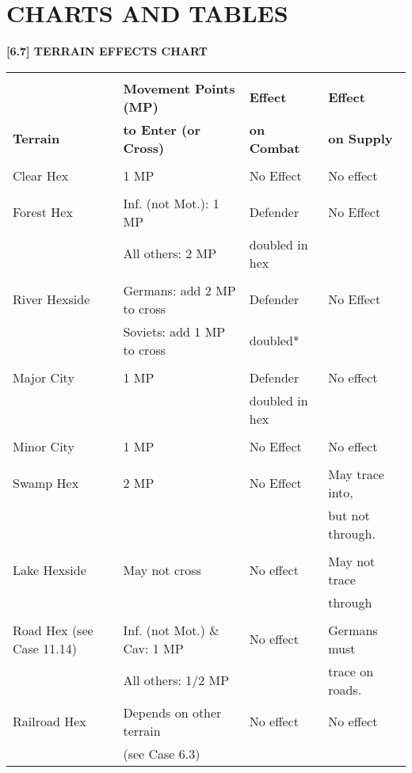\pagebreak
\section{CHARTS AND TABLES}

\textbf{[6.7] TERRAIN EFFECTS CHART}

\begin{tabular}{|llll|}
  \hline & & &\\[-2.0ex]
  & \textbf{Movement Points (MP)} & \textbf{Effect} & \textbf{Effect}\\
  \textbf{Terrain} & \textbf{to Enter (or Cross)} & \textbf{on Combat} & \textbf{on Supply}\\
  \hline & & &\\[-2.0ex]
  Clear Hex & 1 MP & No Effect & No effect\\
  \hline & & &\\[-2.0ex]
  Forest Hex & Inf. (not Mot.): 1 MP & Defender & No Effect\\
  & All others: 2 MP & doubled in hex &\\
  \hline & & &\\[-2.0ex]
  River Hexside & Germans: add 2 MP to cross & Defender & No Effect\\
  & Soviets: add 1 MP to cross & doubled* &\\
  \hline & & &\\[-2.0ex]
  Major City & 1 MP & Defender & No effect\\
  & & doubled in hex &\\
  \hline & & &\\[-2.0ex]
  Minor City & 1 MP & No Effect & No effect\\
  \hline & & &\\[-2.0ex]
  Swamp Hex & 2 MP & No Effect & May trace into,\\
  & & & but not through.\\
  \hline & & &\\[-2.0ex]
  Lake Hexside & May not cross & No effect & May not trace\\
  & & & through\\
  \hline & & &\\[-2.0ex]
  Road Hex (see Case 11.14)& Inf. (not Mot.) \& Cav: 1 MP & No effect & Germans must\\
  & All others: 1/2 MP & & trace on roads.\\
  \hline
  Railroad Hex & Depends on other terrain & No effect & No effect\\
  & (see Case 6.3) & &\\
  \hline
\end{tabular}